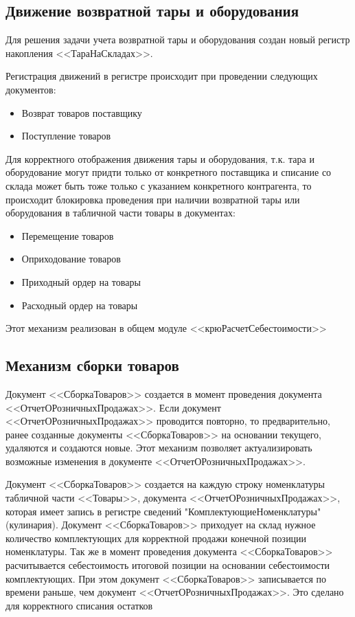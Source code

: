 \subsection{Движение возвратной тары и оборудования}\label{1003}

Для решения задачи учета возвратной тары и оборудования создан новый регистр накопления <<ТараНаСкладах>>.

Регистрация движений в регистре происходит при проведении следующих документов:
\begin{itemize}
	\item Возврат товаров поставщику
	\item Поступление товаров
\end{itemize}

Для корректного отображения движения тары и оборудования, т.к. тара и оборудование могут придти только от конкретного поставщика и списание со склада может быть тоже только с указанием конкретного контрагента, то происходит блокировка проведения при наличии возвратной тары или оборудования в табличной части товары в  документах:

\begin{itemize}
	\item Перемещение товаров
	\item Оприходование товаров
	\item Приходный ордер на товары
	\item Расходный ордер на товары
\end{itemize}

Этот механизм реализован в общем модуле <<крюРасчетСебестоимости>>


\subsection{Механизм сборки товаров}\label{1004}

Документ <<СборкаТоваров>> создается в момент проведения документа <<ОтчетОРозничныхПродажах>>.
Если документ <<ОтчетОРозничныхПродажах>> проводится повторно, то предварительно, ранее созданные документы <<СборкаТоваров>> на основании текущего, удаляются и создаются новые. Этот механизм позволяет актуализировать возможные изменения в документе <<ОтчетОРозничныхПродажах>>.

Документ <<СборкаТоваров>> создается на каждую строку номенклатуры табличной части <<Товары>>, документа  <<ОтчетОРозничныхПродажах>>, которая имеет запись в регистре сведений "КомплектующиеНоменклатуры" (кулинария).
Документ <<СборкаТоваров>> приходует на склад нужное количество комплектующих для корректной продажи конечной позиции номенклатуры. Так же в момент проведения документа <<СборкаТоваров>> расчитывается себестоимость итоговой позиции на основании себестоимости комплектующих.
При этом документ <<СборкаТоваров>> записывается по времени раньше, чем документ <<ОтчетОРозничныхПродажах>>. Это сделано для корректного списания остатков

